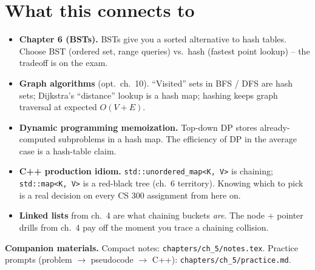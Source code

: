 \documentclass[11pt]{article}
\begin{document}
\section*{What this connects to}

\begin{notebox}
\begin{itemize}
    \item \textbf{Chapter 6 (BSTs).} BSTs give you a sorted alternative
    to hash tables. Choose BST (ordered set, range queries) vs.\ hash
    (fastest point lookup) -- the tradeoff is on the exam.
    \item \textbf{Graph algorithms} (opt.\ ch.~10). ``Visited'' sets in
    BFS / DFS are hash sets; Dijkstra's ``distance'' lookup is a hash
    map; hashing keeps graph traversal at expected $O(V + E)$.
    \item \textbf{Dynamic programming memoization.} Top-down DP stores
    already-computed subproblems in a hash map. The efficiency of DP
    in the average case is a hash-table claim.
    \item \textbf{C++ production idiom.}
    \texttt{std::unordered\_map<K, V>} is chaining; \texttt{std::map<K,
    V>} is a red-black tree (ch.~6 territory). Knowing which to pick
    is a real decision on every CS 300 assignment from here on.
    \item \textbf{Linked lists} from ch.~4 are what chaining buckets
    \emph{are}. The node + pointer drills from ch.~4 pay off the moment
    you trace a chaining collision.
\end{itemize}
\end{notebox}

\textbf{Companion materials.} Compact notes:
\texttt{chapters/ch\_5/notes.tex}. Practice prompts (problem $\to$
pseudocode $\to$ C++): \texttt{chapters/ch\_5/practice.md}.
\end{document}
